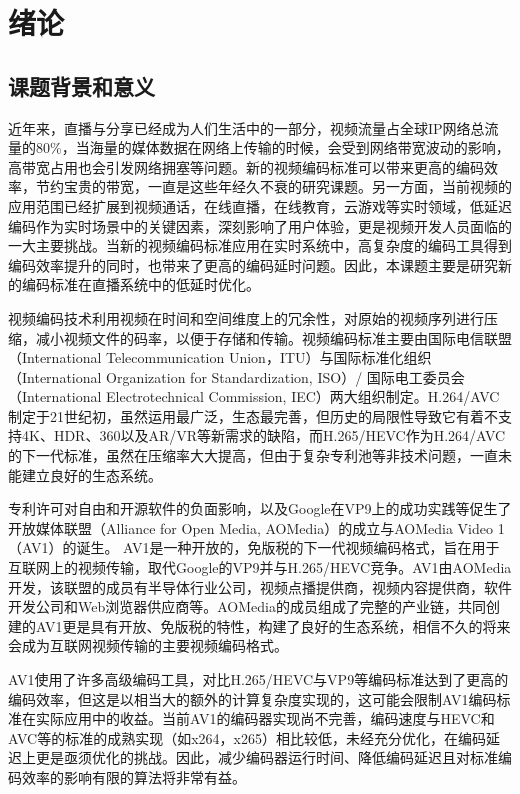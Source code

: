 
\chapter{绪论}
\section{课题背景和意义}

近年来，直播与分享已经成为人们生活中的一部分，视频流量占全球IP网络总流量的80\%\cite{CiscoVisualNetworking2018}，当海量的媒体数据在网络上传输的时候，会受到网络带宽波动的影响，高带宽占用也会引发网络拥塞等问题。新的视频编码标准可以带来更高的编码效率，节约宝贵的带宽，一直是这些年经久不衰的研究课题。另一方面，当前视频的应用范围已经扩展到视频通话，在线直播，在线教育，云游戏等实时领域，低延迟编码作为实时场景中的关键因素，深刻影响了用户体验，更是视频开发人员面临的一大主要挑战\cite{BitmovinVideoDeveloper2019}。当新的视频编码标准应用在实时系统中，高复杂度的编码工具得到编码效率提升的同时，也带来了更高的编码延时问题。因此，本课题主要是研究新的编码标准在直播系统中的低延时优化。

视频编码技术利用视频在时间和空间维度上的冗余性，对原始的视频序列进行压缩，减小视频文件的码率，以便于存储和传输。视频编码标准主要由国际电信联盟（International Telecommunication Union，ITU）与国际标准化组织（International Organization for Standardization, ISO）/ 国际电工委员会（International Electrotechnical Commission, IEC）两大组织制定。H.264/AVC制定于21世纪初，虽然运用最广泛，生态最完善，但历史的局限性导致它有着不支持4K、HDR、360以及AR/VR等新需求的缺陷，而H.265/HEVC作为H.264/AVC的下一代标准，虽然在压缩率大大提高，但由于复杂专利池等非技术问题，一直未能建立良好的生态系统。

专利许可对自由和开源软件的负面影响，以及Google在VP9上的成功实践等促生了开放媒体联盟（Alliance for Open Media, AOMedia）的成立与AOMedia Video 1（AV1）的诞生。 AV1是一种开放的，免版税的下一代视频编码格式，旨在用于互联网上的视频传输，取代Google的VP9并与H.265/HEVC竞争。AV1由AOMedia开发，该联盟的成员有半导体行业公司，视频点播提供商，视频内容提供商，软件开发公司和Web浏览器供应商等。AOMedia的成员组成了完整的产业链，共同创建的AV1更是具有开放、免版税的特性，构建了良好的生态系统，相信不久的将来会成为互联网视频传输的主要视频编码格式。

AV1使用了许多高级编码工具\cite{chenOverviewCoreCoding2018}，对比H.265/HEVC与VP9等编码标准达到了更高的编码效率\cite{laudeComparisonJEMAV12018,akyaziComparisonCompressionEfficiency2018}，但这是以相当大的额外的计算复杂度实现的，这可能会限制AV1编码标准在实际应用中的收益。当前AV1的编码器实现尚不完善，编码速度与HEVC和AVC等的标准的成熟实现（如x264，x265）相比较低，未经充分优化，在编码延迟上更是亟须优化的挑战。因此，减少编码器运行时间、降低编码延迟且对标准编码效率的影响有限的算法将非常有益。

